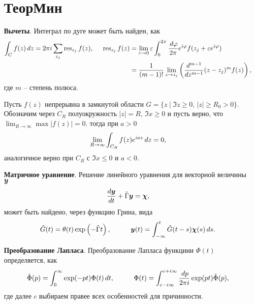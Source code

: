 \section*{ТеорМин}



\textbf{Вычеты}. Интеграл по дуге может быть найден, как
\begin{align*}
    \int_C f(z) \, d z = 2 \pi i \sum_{z_j} \mathop{\mathrm{res}}\nolimits_{z_j} f(z),
    \hspace{5 mm} 
    \mathop{\mathrm{res}}\nolimits_{z_j} f(z) &= \lim_{\varepsilon \to 0} \varepsilon \int_0^{2\pi} \frac{\, d \varphi}{2\pi} e^{i \varphi} f(z_j + \varepsilon e^{i \varphi}) \\ 
    &= \frac{1}{(m-1)!} \lim_{z \to z_j} \left(
        \frac{d^{m-1} }{d z^{m-1}} (z-z_j)^m f(z)
    \right),
\end{align*}
где $m$ -- степень полюса. 



\begin{to_lem}
    Пусть $f(z)$ непрерывна в замкнутой области $G = \{z \mid \Im z \geq 0,\,  |z| \geq R_0 > 0\}$. Обозначим через $C_R$ полуокружность $|z| = R,\, \Im x \geq 0$ и пусть верно, что $\lim_{R \to \infty} \max |f(z)| =0$. тогда при $a > 0$
    \begin{equation*}
        \lim_{R \to \infty} \int_{C_R} f(z) e^{i a z} \, d z = 0,
    \end{equation*}
    аналогичное верно при $C_R$ с $\Im x \leq 0$ и $a < 0$. 
\end{to_lem}



\textbf{Матричное уравнение}. Решение линейного уравнения для векторной величины $\mbox{\boldmath $y$}$
\begin{equation*}
    \frac{d \mbox{\boldmath $y$}}{d t} + \hat{\Gamma} \mbox{\boldmath $y$} = \mbox{\boldmath $\chi$},
\end{equation*}
может быть найдено, через функцию Грина, вида
\begin{equation*}
    \hat{G} (t) = \theta(t) \exp\left(- \hat{\Gamma} t\right),
    \hspace{10 mm} 
    \vc{y}(t) = \int_{-\infty}^{t}  \hat{G}(t-s) \vc{\chi}(s) \d s.
\end{equation*}





\textbf{Преобразование Лапласа}. Преобразование Лапласа функциии $\Phi(t)$ определяется, как
\begin{equation*}
    \tilde{\Phi}(p) = \int_{0}^{\infty}  \exp(-pt) \Phi(t) \d t,
    \hspace{10 mm} 
    \Phi(t) = \int_{c-i \infty}^{c+i \infty} \frac{\d p}{2 \pi i} \exp(pt) \tilde{\Phi}(p),
\end{equation*}
где далее $c$ выбираем правее всех особенностей для причинности. 

